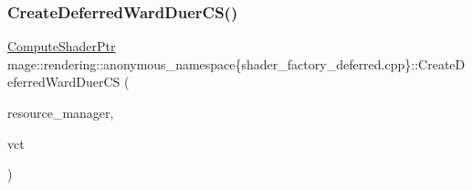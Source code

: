 \subsubsection{\texorpdfstring{Create\+Deferred\+Ward\+Duer\+C\+S()}{CreateDeferredWardDuerCS()}}
{\footnotesize\ttfamily \mbox{\hyperlink{namespacemage_1_1rendering_ab3dc9f2114f2e9255b91d9c051da52ea}{Compute\+Shader\+Ptr}} mage\+::rendering\+::anonymous\+\_\+namespace\{shader\+\_\+factory\+\_\+deferred.\+cpp\}\+::Create\+Deferred\+Ward\+Duer\+CS (\begin{DoxyParamCaption}\item[{\mbox{\hyperlink{classmage_1_1rendering_1_1_resource_manager}{Resource\+Manager}} \&}]{resource\+\_\+manager,  }\item[{bool}]{vct }\end{DoxyParamCaption})}

